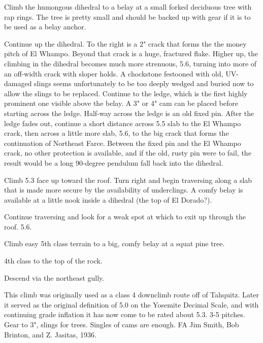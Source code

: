 \documentclass{tahquitz}
\begin{document}
 Climb the humongous dihedral to a belay at a small forked deciduous tree with rap
rings. The tree is pretty small and should be backed up with gear if it is to be
used as a belay anchor.

 Continue up the dihedral. To the right is a 2" crack that forms the
the money pitch of El Whampo. Beyond that crack is a huge, fractured flake.
Higher up, the climbing in the dihedral becomes much more strenuous, 5.6, turning
into more of an off-width crack with sloper holds. A chockstone festooned with
old, UV-damaged slings seems unfortunately to be too deeply wedged and buried
now to allow the slings to be replaced. Continue to the ledge, which is the first
highly prominent one visible above the belay. A 3" or 4" cam can be placed before
starting across the ledge. Half-way across the ledge is an old fixed pin. After the
ledge fades out, continue a short distance across 5.5 slab to the El Whampo crack,
then across a little more slab, 5.6, to the big crack that forms the continuation
of Northeast Farce.
Between the fixed pin and the El Whampo crack, no other protection is available,
and if the old, rusty pin were to fail, the result would be a long 90-degree pendulum
fall back into the dihedral.

 Climb 5.3 face up toward the roof.
Turn right and begin traversing
along a slab that is made more secure by the availability of underclings. A comfy
belay is available at a little nook inside a dihedral (the top of El Dorado?).

 Continue traversing and look for a weak spot at which to exit up through the roof. 5.6.

 Climb easy 5th class terrain to a big, comfy belay at a squat pine tree.

 4th class to the top of the rock.

Descend via the northeast gully.




This climb was originally used as a class 4 downclimb route off of Tahquitz.
Later it served as the original definition of 5.0 on the Yosemite Decimal
Scale, and with continuing grade inflation it has now come to be
rated about 5.3. 3-5 pitches. Gear to 3",
slings for trees. Singles of cams are enough.
FA Jim Smith, Bob Brinton, and Z. Jasitas, 1936.
\end{document}
